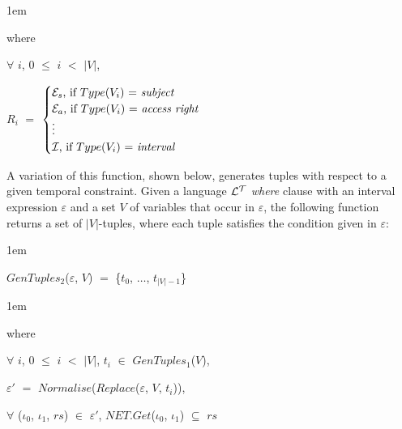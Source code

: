 \documentclass[11pt]{report}
\newenvironment{vquote}
{
  \begin{list}{}{\leftmargin 1em}\item[]
}
{
  \end{list}
}
\begin{document}
            \begin{vquote}
              where

              \hspace{1em}
              $\forall$ $i$, $0$ $\leq$ $i$ $<$ $|V|$,

              \hspace{1em}
              $R_i$ $=$
              \begin{math}
                \begin{cases}
                  \mbox{${\cal E}_s$, if $Type$($V_i$) $=$ {\em subject}} \\
                  \mbox{${\cal E}_a$, if $Type$($V_i$) $=$ {\em access right}} \\
                  \vdots \\
                  \mbox{${\cal I}$, if $Type$($V_i$) $=$ {\em interval}}
                \end{cases}
              \end{math}
            \end{vquote}

            A variation of this function, shown below, generates tuples
            with respect to a given temporal constraint. Given a language
            ${\cal L^T}$ {\em where} clause with an interval expression
            $\varepsilon$ and a set $V$ of variables that occur in
            $\varepsilon$, the following function returns a set of
            $|V|$-tuples, where each tuple satisfies the condition given
            in $\varepsilon$:

            \begin{vquote}
              $GenTuples_2$($\varepsilon$, $V$)
              $=$ \{$t_0$, $\ldots$, $t_{|V|-1}$\}
            \end{vquote}

            \begin{vquote}
              where

              \hspace{1em}
              $\forall$ $i$, $0$ $\leq$ $i$ $<$ $|V|$,
              $t_i$ $\in$ $GenTuples_1$($V$),

              \hspace{1em}
              $\varepsilon'$ $=$
              $Normalise$($Replace$($\varepsilon$, $V$, $t_i$)),

              \hspace{1em}
              $\forall$ (${\iota}_0$, ${\iota}_1$, $rs$) $\in$
              $\varepsilon'$,
              $NET.Get$(${\iota}_0$, ${\iota}_1$) $\subseteq$ $rs$
            \end{vquote}
\end{document}
